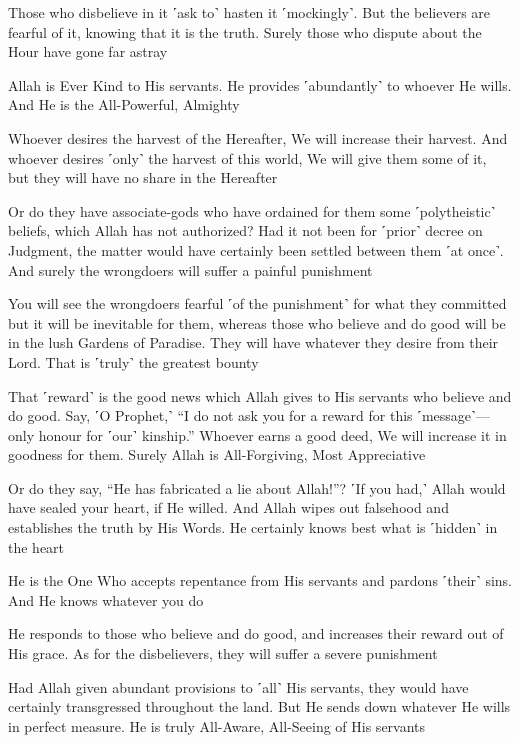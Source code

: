 Those who disbelieve in it ˹ask to˺ hasten it ˹mockingly˺. But the believers are fearful of it, knowing that it is the truth. Surely those who dispute about the Hour have gone far astray

Allah is Ever Kind to His servants. He provides ˹abundantly˺ to whoever He wills. And He is the All-Powerful, Almighty

Whoever desires the harvest of the Hereafter, We will increase their harvest. And whoever desires ˹only˺ the harvest of this world, We will give them some of it, but they will have no share in the Hereafter

Or do they have associate-gods who have ordained for them some ˹polytheistic˺ beliefs, which Allah has not authorized? Had it not been for ˹prior˺ decree on Judgment, the matter would have certainly been settled between them ˹at once˺. And surely the wrongdoers will suffer a painful punishment

You will see the wrongdoers fearful ˹of the punishment˺ for what they committed but it will be inevitable for them, whereas those who believe and do good will be in the lush Gardens of Paradise. They will have whatever they desire from their Lord. That is ˹truly˺ the greatest bounty

That ˹reward˺ is the good news which Allah gives to His servants who believe and do good. Say, ˹O Prophet,˺ “I do not ask you for a reward for this ˹message˺—only honour for ˹our˺ kinship.” Whoever earns a good deed, We will increase it in goodness for them. Surely Allah is All-Forgiving, Most Appreciative

Or do they say, “He has fabricated a lie about Allah!”? ˹If you had,˺ Allah would have sealed your heart, if He willed. And Allah wipes out falsehood and establishes the truth by His Words. He certainly knows best what is ˹hidden˺ in the heart

He is the One Who accepts repentance from His servants and pardons ˹their˺ sins. And He knows whatever you do

He responds to those who believe and do good, and increases their reward out of His grace. As for the disbelievers, they will suffer a severe punishment

Had Allah given abundant provisions to ˹all˺ His servants, they would have certainly transgressed throughout the land. But He sends down whatever He wills in perfect measure. He is truly All-Aware, All-Seeing of His servants

